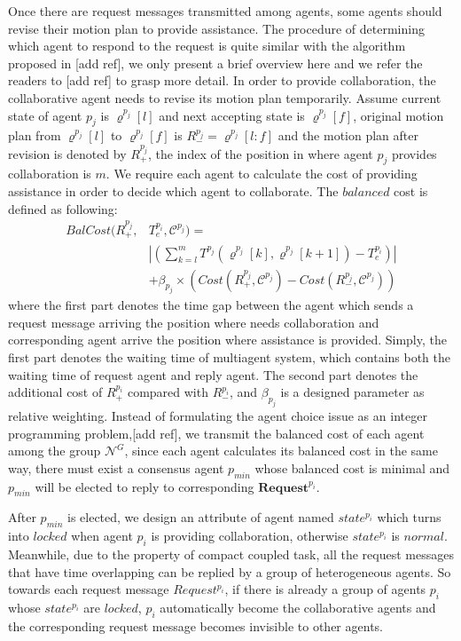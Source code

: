 \documentclass[journal]{IEEEtran}
\begin{document}
Once there are request messages transmitted among agents, some agents should revise their motion plan to provide assistance. The procedure of determining which agent to respond to the request is quite similar with the algorithm proposed in [add ref], we only present a brief overview here and we refer the readers to [add ref] to grasp more detail. In order to provide collaboration, the collaborative agent needs to revise its motion plan temporarily. Assume current state of agent $p_j$ is $\varrho^{p_j}[l]$ and next accepting state is $\varrho^{p_j}[f]$, original motion plan from $\varrho^{p_j}[l]$ to $\varrho^{p_j}[f]$ is $R^{p_j}_-=\varrho^{p_j}[l:f]$ and the motion plan after revision is denoted by $R^{p_j}_+$, the index of the position in where agent $p_j$ provides collaboration is $m$. We require each agent to calculate the cost of providing assistance in order to decide which agent to collaborate. The $balanced$ cost is defined as following:
\[ \begin{split}
BalCost(R^{p_j}_+,&T^{p_i}_e,\mathcal{C}^{p_j})=\\
&|(\sum_{k=l}^{m}T^{p_j}(\varrho^{p_j}[k],\varrho^{p_j}[k+1])-T^{p_i}_e)|\\
&+\beta_{p_j} \times (Cost(R^{p_j}_+,\mathcal{C}^{p_j})-Cost(R^{p_j}_-,\mathcal{C}^{p_j}))
\end{split} \]
where the first part denotes the time gap between the agent which sends a request message arriving the position where needs collaboration and corresponding agent arrive the position where assistance is provided. Simply, the first part denotes the waiting time of multiagent system, which contains both the waiting time of request agent and reply agent. The second part denotes the additional cost of $R^{p_i}_+$ compared with $R^{p_i}_-$, and $\beta_{p_j}$ is a designed parameter as relative weighting. Instead of formulating the agent choice issue as an integer programming problem,[add ref], we transmit the balanced cost of each agent among the group $\mathcal{N}^{G}$, since each agent calculates its balanced cost in the same way, there must exist a consensus agent $p_{min}$ whose balanced cost is minimal and $p_{min}$ will be elected to reply to corresponding $\textbf{Request}^{p_i}$.\par
After $p_{min}$ is elected, we design an attribute of agent named $state^{p_i}$ which turns into $locked$ when agent $p_i$ is providing collaboration, otherwise $state^{p_i}$ is $normal$. Meanwhile, due to the property of compact coupled task, all the request messages that have time overlapping can be replied by a group of heterogeneous agents. So towards each request message $Request^{p_i}$, if there is already a group of agents ${p_i}$ whose $state^{p_i}$ are $locked$, ${p_i}$ automatically become the collaborative agents and the corresponding request message becomes invisible to other agents.\par
\end{document}
